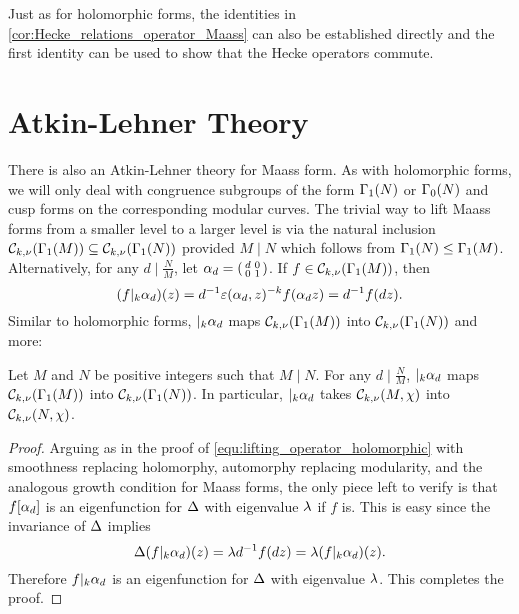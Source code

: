     Just as for holomorphic forms, the identities in \cref{cor:Hecke_relations_operator_Maass} can also be established directly and the first identity can be used to show that the Hecke operators commute.
  \section{Atkin-Lehner Theory}
    There is also an Atkin-Lehner theory for Maass form. As with holomorphic forms, we will only deal with congruence subgroups of the form $\Gamma_{1}(N)$ or $\Gamma_{0}(N)$ and cusp forms on the corresponding modular curves. The trivial way to lift Maass forms from a smaller level to a larger level is via the natural inclusion $\mathcal{C}_{k,\nu}(\Gamma_{1}(M)) \subseteq \mathcal{C}_{k,\nu}(\Gamma_{1}(N))$ provided $M \mid N$ which follows from $\Gamma_{1}(N) \le \Gamma_{1}(M)$. Alternatively, for any $d \mid \frac{N}{M}$, let $\alpha_{d} = \begin{psmallmatrix} d & 0 \\ 0 & 1 \end{psmallmatrix}$. If $f \in \mathcal{C}_{k,\nu}(\Gamma_{1}(M))$, then
    \[
      (f|_{k}\alpha_{d})(z) = d^{-1}\varepsilon(\alpha_{d},z)^{-k}f(\alpha_{d} z) = d^{-1}f(dz).
    \]
    Similar to holomorphic forms, $|_{k}\alpha_{d}$ maps $\mathcal{C}_{k,\nu}(\Gamma_{1}(M))$ into $\mathcal{C}_{k,\nu}(\Gamma_{1}(N))$ and more:
    
    \begin{proposition}\label{equ:lifting_operator_Maass}
      Let $M$ and $N$ be positive integers such that $M \mid N$. For any $d \mid \frac{N}{M}$, $|_{k}\alpha_{d}$ maps $\mathcal{C}_{k,\nu}(\Gamma_{1}(M))$ into $\mathcal{C}_{k,\nu}(\Gamma_{1}(N))$. In particular, $|_{k}\alpha_{d}$ takes $\mathcal{C}_{k,\nu}(M,\chi)$ into $\mathcal{C}_{k,\nu}(N,\chi)$.
    \end{proposition}
    \begin{proof}
      Arguing as in the proof of \cref{equ:lifting_operator_holomorphic} with smoothness replacing holomorphy, automorphy replacing modularity, and the analogous growth condition for Maass forms, the only piece left to verify is that $f[\alpha_{d}]$ is an eigenfunction for $\Delta$ with eigenvalue $\lambda$ if $f$ is. This is easy since the invariance of $\Delta$ implies
      \[
        \Delta(f|_{k}\alpha_{d})(z) = \lambda d^{-1}f(dz) = \lambda(f|_{k}\alpha_{d})(z).
      \]
      Therefore $f|_{k}\alpha_{d}$ is an eigenfunction for $\Delta$ with eigenvalue $\lambda$. This completes the proof.
    \end{proof}

